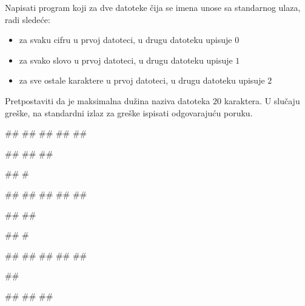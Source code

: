 \begin{Exercise}[label=p3_id16]         
Napisati program koji za dve datoteke čija se imena unose sa standarnog ulaza, radi sledeće:
\begin{itemize}
\item{za svaku cifru u prvoj datoteci, u drugu datoteku upisuje $0$}
\item{za svako slovo u prvoj datoteci, u drugu datoteku upisuje $1$}
\item{za sve ostale karaktere u prvoj datoteci, u drugu datoteku upisuje $2$}
\end{itemize}
Pretpostaviti da je maksimalna dužina naziva datoteka $20$ karaktera. 
U slučaju greške, na standardni izlaz za greške ispisati odgovarajuću poruku.

\begin{minitest}
\begin{upotreba}{1}
#\naslovInt#
##
##
##
##

##
##
##

##
#
\end{upotreba}
\end{minitest}
\begin{minitest}
\begin{upotreba}{2}
#\naslovInt#
##
##
##
##

##
##

##
#
\end{upotreba}
\end{minitest}
\begin{minitest}
\begin{upotreba}{3}
#\naslovInt#
##
##
##
##

##

#\naslovIzlazZaGresku#
##
##
\end{upotreba}
\end{minitest}
\end{Exercise}
\begin{Answer}[ref=p3_id16]
\end{Answer}


